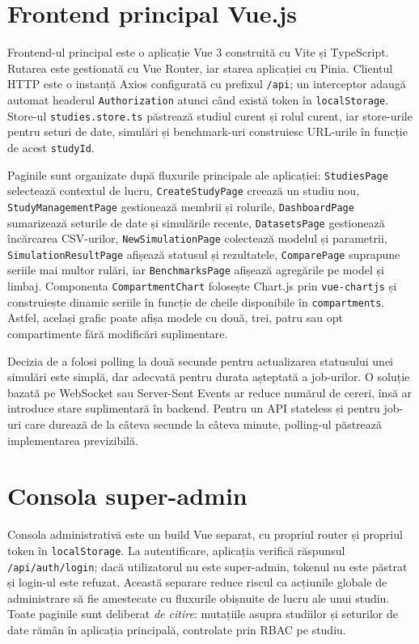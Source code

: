 \section{Frontend principal Vue.js}
\label{sec:frontend_vue}

Frontend-ul principal este o aplicație Vue 3 construită cu Vite și TypeScript.
Rutarea este gestionată cu Vue Router, iar starea aplicației cu Pinia. Clientul
HTTP este o instanță Axios configurată cu prefixul \texttt{/api}; un interceptor
adaugă automat headerul \texttt{Authorization} atunci când există token în
\texttt{localStorage}. Store-ul \texttt{studies.store.ts} păstrează studiul
curent și rolul curent, iar store-urile pentru seturi de date, simulări și
benchmark-uri construiesc URL-urile în funcție de acest \texttt{studyId}.

Paginile sunt organizate după fluxurile principale ale aplicației:
\texttt{StudiesPage} selectează contextul de lucru,
\texttt{CreateStudyPage} creează un studiu nou,
\texttt{StudyManagementPage} gestionează membrii și rolurile,
\texttt{DashboardPage} sumarizează seturile de date și simulările recente,
\texttt{DatasetsPage} gestionează încărcarea CSV-urilor,
\texttt{NewSimulationPage} colectează modelul și parametrii,
\texttt{SimulationResultPage} afișează statusul și rezultatele,
\texttt{ComparePage} suprapune seriile mai multor rulări, iar
\texttt{BenchmarksPage} afișează agregările pe model și limbaj. Componenta
\texttt{CompartmentChart} folosește Chart.js prin \texttt{vue-chartjs} și
construiește dinamic seriile în funcție de cheile disponibile în
\texttt{compartments}. Astfel, același grafic poate afișa modele cu două,
trei, patru sau opt compartimente fără modificări suplimentare.

Decizia de a folosi polling la două secunde pentru actualizarea statusului unei
simulări este simplă, dar adecvată pentru durata așteptată a job-urilor. O
soluție bazată pe WebSocket sau Server-Sent Events ar reduce numărul de cereri,
însă ar introduce stare suplimentară în backend. Pentru un API stateless și
pentru job-uri care durează de la câteva secunde la câteva minute, polling-ul
păstrează implementarea previzibilă.

\section{Consola super-admin}
\label{sec:frontend_admin}

Consola administrativă este un build Vue separat, cu propriul router și propriul
token în \texttt{localStorage}. La autentificare, aplicația verifică răspunsul
\texttt{/api/auth/login}; dacă utilizatorul nu este super-admin, tokenul nu este
păstrat și login-ul este refuzat. Această separare reduce riscul ca acțiunile
globale de administrare să fie amestecate cu fluxurile obișnuite de lucru ale
unui studiu. Toate paginile sunt deliberat \emph{de citire}: mutațiile asupra
studiilor și seturilor de date rămân în aplicația principală, controlate prin
RBAC pe studiu.


